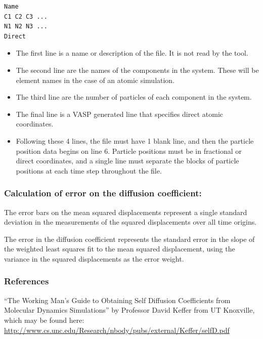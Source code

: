 \documentclass[letterpaper,10pt,english]{sphinxmanual}
\begin{document}
\begin{Verbatim}[commandchars=\\\{\}]
Name
C1 C2 C3 ...
N1 N2 N3 ...
Direct
\end{Verbatim}
\begin{itemize}
\item {} 
The first line is a name or description of the file. It is not read by the tool.

\item {} 
The second line are the names of the components in the system. These will be element names in the case of an atomic simulation.

\item {} 
The third line are the number of particles of each component in the system.

\item {} 
The final line is a VASP generated line that specifies direct atomic coordinates.

\item {} 
Following these 4 lines, the file must have 1 blank line, and then the particle position data begins on line 6. Particle positions must be in fractional or direct coordinates, and a single line must separate the blocks of particle positions at each time step throughout the file.

\end{itemize}


\subsubsection{Calculation of error on the diffusion coefficient:}
\label{8_0_3_diffanalyzer:calculation-of-error-on-the-diffusion-coefficient}
The error bars on the mean squared displacements represent a single standard deviation in the measurements of the squared displacements over all time origins.

The error in the diffusion coefficient represents the standard error in the slope of the weighted least squares fit to the mean squared displacement, using the variance in the squared displacements as the error weight.


\subsubsection{References}
\label{8_0_3_diffanalyzer:references}
``The Working Man's Guide to Obtaining Self Diffusion Coefficients from Molecular Dynamics Simulations'' by Professor David Keffer from UT Knoxville, which may be found here: \href{http://www.cs.unc.edu/Research/nbody/pubs/external/Keffer/selfD.pdf}{http://www.cs.unc.edu/Research/nbody/pubs/external/Keffer/selfD.pdf}
\end{document}
